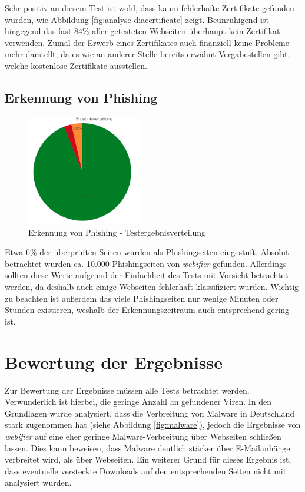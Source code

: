 Sehr positiv an diesem Test ist wohl, dass kaum fehlerhafte Zertifikate gefunden wurden, wie
Abbildung \ref{fig:analyse-diacertificate} zeigt. Beunruhigend ist hingegend das fast 84\% aller getesteten Webseiten überhaupt kein Zertifikat verwenden. Zumal der Erwerb eines Zertifikates auch finanziell keine Probleme mehr darstellt, da es wie an anderer Stelle bereits erwähnt Vergabestellen gibt, welche kostenlose Zertifikate ausstellen.

\subsection{Erkennung von Phishing}
\begin{figure}[H]
  \centering
  \includegraphics[width=5cm]{images/stats/diaphishing}
  \caption{Erkennung von Phishing - Testergebnisverteilung}
  \label{fig:analyse-diaphishing}
\end{figure}

Etwa 6\% der überprüften Seiten wurden als Phishingseiten eingestuft. Absolut betrachtet wurden ca. 10.000 Phishingseiten von \textit{webifier} gefunden. Allerdings sollten diese Werte aufgrund der Einfachheit des Tests mit Vorsicht betrachtet werden, da deshalb auch einige Webseiten fehlerhaft klassifiziert wurden. Wichtig zu beachten ist außerdem das viele Phishingseiten nur wenige Minuten oder Stunden existieren, weshalb der Erkennungszeitraum auch entsprechend gering ist.

\section{Bewertung der Ergebnisse}
Zur Bewertung der Ergebnisse müssen alle Tests betrachtet werden. Verwunderlich ist hierbei, die geringe Anzahl an gefundener Viren. In den Grundlagen wurde analysiert, dass die Verbreitung von Malware in Deutschland stark zugenommen hat (siehe Abbildung \ref{fig:malware}), jedoch die Ergebnisse von \textit{webifier} auf eine eher geringe Malware-Verbreitung über Webseiten schließen lassen. Dies kann beweisen, dass Malware deutlich stärker über E-Mailanhänge verbreitet wird, als über Webseiten. Ein weiterer Grund für dieses Ergebnis ist, dass eventuelle versteckte Downloads auf den entsprechenden Seiten nicht mit analysiert wurden.

